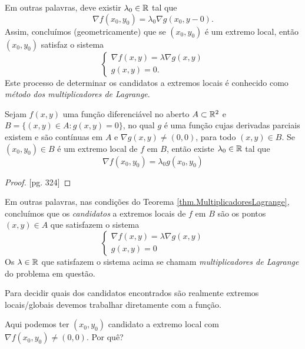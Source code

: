Em outras palavras, deve existir \(\lambda_0\in\mathbb{R}\) tal que \[\nabla f(x_0,y_0) = \lambda_0 \nabla g(x_0,y-0).\] Assim, concluímos (geometricamente) que se \((x_0,y_0)\) é um extremo local, então \((x_0,y_0)\) satisfaz o sistema \[\begin{cases}
    \nabla f(x,y) = \lambda \nabla g(x,y) \\
    g(x,y) = 0.
\end{cases}\] Este processo de determinar os candidatos a extremos locais é conhecido como \textit{método dos multiplicadores de Lagrange}.

\begin{theorem}\label{thm.MultiplicadoresLagrange}
    Sejam \(f(x,y)\) uma função diferenciável no aberto \(A\subset\mathbb{R}^2\) e \(B = \{(x,y)\in A: g(x,y) = 0\}\), no qual \(g\) é uma função cujas derivadas parciais existem e são contínuas em \(A\) e \(\nabla g(x,y) \neq (0,0)\), para todo \((x,y)\in B\). Se \((x_0,y_0)\in B\) é um extremo local de \(f\) em \(B\), então existe \(\lambda_0\in\mathbb{R}\) tal que \[\nabla f(x_0,y_0) = \lambda_0 g(x_0,y_0)\]
\end{theorem}

\begin{proof}
    \cite{guidorizzi}[pg. 324]
\end{proof}

Em outras palavras, nas condições do Teorema \ref{thm.MultiplicadoresLagrange}, concluímos que os \textit{candidatos} a extremos locais de \(f\) em \(B\) são os pontos \((x,y)\in A\) que satisfazem o sistema \[\begin{cases}
    \nabla f(x,y) = \lambda \nabla g(x,y)\\
    g(x,y) = 0
\end{cases}\]
Os \(\lambda\in\mathbb{R}\) que satisfazem o sistema acima se chamam \textit{multiplicadores de Lagrange} do problema em questão.

\begin{remark}
    Para decidir quais dos candidatos encontrados são realmente extremos locais/globais devemos trabalhar diretamente com a função.
\end{remark}

\begin{remark}
    Aqui podemos ter \((x_0,y_0)\) candidato a extremo local com \(\nabla f(x_0,y_0)\neq (0,0)\). Por quê?
\end{remark}

